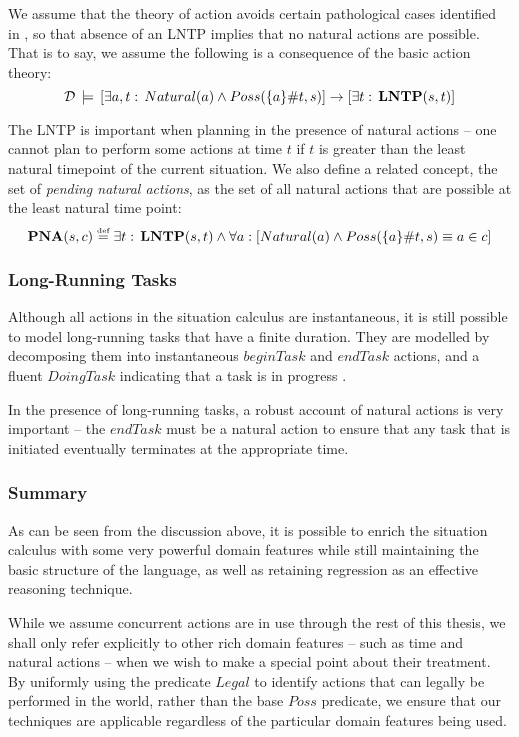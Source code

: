 We assume that the theory of action avoids certain pathological cases
identified in \citep{reiter01kia}, so that absence of an LNTP implies
that no natural actions are possible. That is to say, we assume the
following is a consequence of the basic action theory:\[
\mathcal{D}\,\models\,\left[\exists a,t:\, Natural(a)\wedge Poss(\{a\}\#t,s)\right]\rightarrow\left[\exists t:\,\mathbf{LNTP}(s,t)\right]\]


The LNTP is important when planning in the presence of natural actions
-- one cannot plan to perform some actions at time $t$ if $t$ is
greater than the least natural timepoint of the current situation.
We also define a related concept, the set of \emph{pending natural
actions}, as the set of all natural actions that are possible at the
least natural time point:\[
\mathbf{PNA}(s,c)\stackrel{\mbox{\tiny def}}{=}\exists t:\,\mathbf{LNTP}(s,t)\wedge\forall a:\left[Natural(a)\wedge Poss(\{a\}\#t,s)\equiv a\in c\right]\]



\subsubsection{Long-Running Tasks}

Although all actions in the situation calculus are instantaneous,
it is still possible to model long-running tasks that have a finite
duration. They are modelled by decomposing them into instantaneous
$beginTask$ and $endTask$ actions, and a fluent $DoingTask$ indicating
that a task is in progress \citep{pinto94temporal}.

In the presence of long-running tasks, a robust account of natural
actions is very important -- the $endTask$ must be a natural action
to ensure that any task that is initiated eventually terminates at
the appropriate time.


\subsubsection{Summary}

As can be seen from the discussion above, it is possible to enrich
the situation calculus with some very powerful domain features while
still maintaining the basic structure of the language, as well as
retaining regression as an effective reasoning technique.

While we assume concurrent actions are in use through the rest of
this thesis, we shall only refer explicitly to other rich domain features
-- such as time and natural actions -- when we wish to make a special
point about their treatment. By uniformly using the predicate $Legal$
to identify actions that can legally be performed in the world, rather
than the base $Poss$ predicate, we ensure that our techniques are
applicable regardless of the particular domain features being used.


